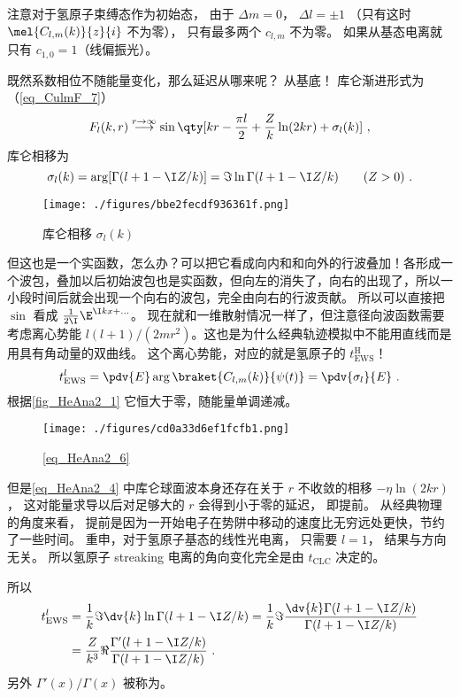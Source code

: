 注意对于氢原子束缚态作为初始态， 由于 $\Delta m = 0$， $\Delta l = \pm 1$ （只有这时 $\mel{C_{l,m}(k)}{z}{i}$ 不为零）， 只有最多两个 $c_{l,m}$ 不为零。 如果从基态电离就只有 $c_{1,0} = 1$（线偏振光）。 

既然系数相位不随能量变化，那么延迟从哪来呢？ 从基底！
库仑渐进形式为（\autoref{eq_CulmF_7}）
\begin{equation}
F_l(k, r) \overset{r\to \infty}{\longrightarrow} \sin\qty[kr - \frac{\pi l}{2} + \frac{Z}{k}\ln(2kr) + \sigma_l(k)]~, %
\end{equation}
库仑相移为
\begin{equation}
\sigma_l(k) = \arg[\Gamma(l+1-\I Z/k)] = \Im\ln\Gamma(l+1-\I Z/k) \qquad (Z > 0)~.
\end{equation}
\begin{figure}[ht]
\centering
\texttt{[image: ./figures/bbe2fecdf936361f.png]}
\caption{库仑相移 $\sigma_l(k)$} \label{fig_HeAna2_1}
\end{figure}
但这也是一个实函数，怎么办？可以把它看成向内和和向外的行波叠加！各形成一个波包，叠加以后初始波包也是实函数，但向左的消失了，向右的出现了，所以一小段时间后就会出现一个向右的波包，完全由向右的行波贡献。 所以可以直接把 $\sin$ 看成 $\frac{1}{2\I}\E^{\I kx + \dots}$。 现在就和一维散射情况一样了，但注意径向波函数需要考虑离心势能 $l(l+1)/(2mr^2)$。这也是为什么经典轨迹模拟中不能用直线而是用具有角动量的双曲线。 这个离心势能，对应的就是氢原子的 $t_\text{EWS}^\text{H}$！
\begin{equation}
t_\text{EWS}^l = \pdv{E} \arg\braket{C_{l,m}(k)}{\psi(t)} = \pdv{\sigma_l}{E}~.
\end{equation}
根据\autoref{fig_HeAna2_1} 它恒大于零，随能量单调递减。
\begin{figure}[ht]
\centering
\texttt{[image: ./figures/cd0a33d6ef1fcfb1.png]}
\caption{\autoref{eq_HeAna2_6} } \label{fig_HeAna2_2}
\end{figure}

但是\autoref{eq_HeAna2_4} 中库仑球面波本身还存在关于 $r$ 不收敛的相移 $-\eta\ln (2kr)$， 这对能量求导以后对足够大的 $r$ 会得到小于零的延迟， 即提前。 从经典物理的角度来看， 提前是因为一开始电子在势阱中移动的速度比无穷远处更快，节约了一些时间。 重申，对于氢原子基态的线性光电离， 只需要 $l = 1$， 结果与方向无关。 所以氢原子 streaking 电离的角向变化完全是由 $t_\text{CLC}$ 决定的。

所以
\begin{equation}\label{eq_tEWS}
\begin{aligned}
t_\text{EWS}^l &= \frac{1}{k} \Im\dv{k}\ln\Gamma(l+1-\I Z/k) = \frac{1}{k} \Im\frac{\dv{k}\Gamma(l+1-\I Z/k)}{\Gamma(l+1-\I Z/k)}\\
&= \frac{Z}{k^3} \Re\frac{\Gamma'(l+1-\I Z/k)}{\Gamma(l+1-\I Z/k)}~.
\end{aligned}
\end{equation}
另外 $\Gamma'(x)/\Gamma(x)$ 被称为。

